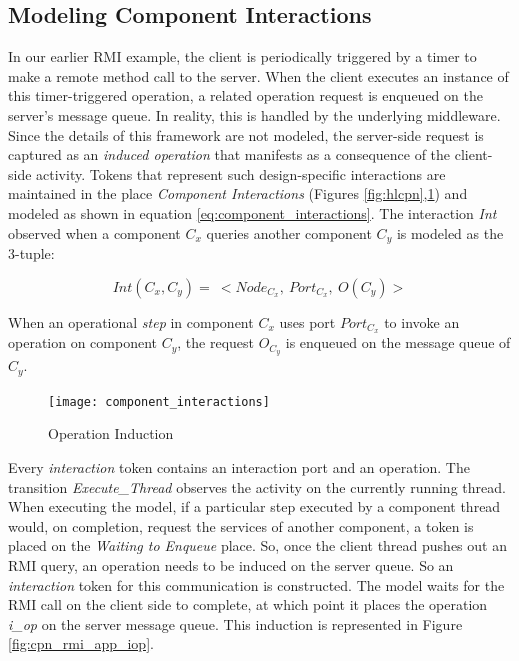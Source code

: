 \subsection{Modeling Component Interactions}
\label{sec:operation_induction}

In our earlier RMI example, the client is periodically triggered by a timer to make a remote method call to the server. When the client executes an instance of this timer-triggered operation, a related operation request is enqueued on the server's message queue. In reality, this is handled by the underlying middleware. Since the details of this framework are not modeled, the server-side request is captured as an \emph{induced operation} that manifests as a consequence of the client-side activity. Tokens that represent such design-specific interactions are maintained in the place \emph{Component Interactions} (Figures \ref{fig:hlcpn},\ref{fig:cpn_iop}) and modeled as shown in equation \ref{eq:component_interactions}. The interaction \emph{Int} observed when a component $C_x$ queries another component $C_y$ is modeled as the 3-tuple:

\begin{equation}
\label{eq:component_interactions}
Int(C_x, C_y) = \ < Node_{C_x}, \ Port_{C_x}, \ O(C_y)>
\end{equation}

When an operational \emph{step} in component $C_x$ uses port $Port_{C_x}$ to invoke an operation on component $C_y$, the request $O_{C_y}$ is enqueued on the message queue of $C_y$. 

 \begin{figure}[ht]
 	\centering
 	\texttt{[image: component\_interactions]}
 	\caption{Operation Induction}
 	\label{fig:cpn_iop}
 \end{figure} 
 
Every \emph{interaction} token contains an interaction port and an operation. The transition \emph{Execute\_Thread} observes the activity on the currently running thread. When executing the model, if a particular step executed by a component thread would, on completion, request the services of another component, a token is placed on the \emph{Waiting to Enqueue} place. So, once the client thread pushes out an RMI query, an operation needs to be induced on the server queue. So an \emph{interaction} token for this communication is constructed. The model waits for the RMI call on the client side to complete, at which point it places the operation \emph{i\_op} on the server message queue. This induction is represented in Figure \ref{fig:cpn_rmi_app_iop}. 

